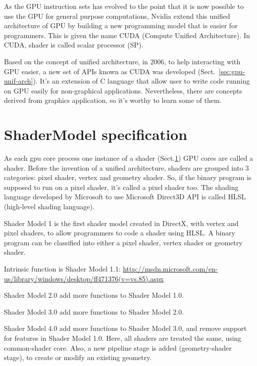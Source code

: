 \begin{framed}
  As the GPU instruction sets has evolved to the point that it is now
  possible to use the GPU for general purpose computations, Nvidia
  extend this unified architecture of GPU by building a new
  programming model that is easier for programmers. This is given the
  name CUDA (Compute Unified Architecture). In CUDA, shader is called
  scalar processor (SP).
\end{framed}


Based on the concept of unified architecture, in 2006, to help interacting with
GPU easier, a new set of APIs known as CUDA was developed (Sect.~\ref{sec:gpu-unif-arch}). It's an
extension of C language that allow user to write code running on GPU
easily for non-graphical applications. Nevertheless, there are
concepts derived from graphics application, so it's worthy to learn
some of them.

\section{ShaderModel specification}
\label{sec:shadermodel_specs}
\label{sec:shader_model}

As each gpu core process one instance of a shader (Sect.\ref{sec:shadermodel_specs})
GPU cores are called a shader. Before the invention of a unified architecture,
shaders are grouped into 3 categories: pixel shader, vertex and geometry shader.
So, if the binary program is supposed to run on a pixel shader, it's called a
pixel shader too. The shading language developed by Microsoft to use Microsoft
Direct3D API is called HLSL (high-level shading language). 

Shader Model 1 is the first shader model created in DirectX, with vertex and
pixel shaders, to allow programmers to code a shader using HLSL. A binary
program can be classified into either a pixel shader, vertex shader or geometry
shader.


Intrinsic function is Shader Model 1.1:
\url{http://msdn.microsoft.com/en-us/library/windows/desktop/ff471376(v=vs.85).aspx}

Shader Model 2.0 add more functions to Shader Model 1.0. 

Shader Model 3.0 add more functions to Shader Model 2.0.

Shader Model 4.0 add more functions to Shader Model 3.0, and remove support for
features in Shader Model 1.0. Here, all shaders are treated the same, using
common-shader core. Also, a new pipeline stage is added (geometry-shader stage),
to create or modify an existing geometry. 

